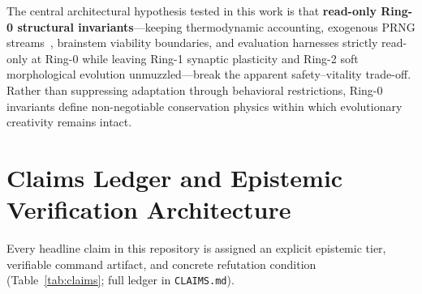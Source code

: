 \documentclass[11pt,reqno]{amsart}
\theoremstyle{plain}
\theoremstyle{definition}
\theoremstyle{remark}
\newcommand{\code}[1]{{\footnotesize\nolinkurl{#1}}}
\begin{document}
The central architectural hypothesis tested in this work is that \textbf{read-only Ring-0 structural invariants}---keeping thermodynamic accounting, exogenous PRNG streams~\cite{salmon2011parallel}, brainstem viability boundaries, and evaluation harnesses strictly read-only at Ring-0 while leaving Ring-1 synaptic plasticity and Ring-2 soft morphological evolution unmuzzled---break the apparent safety--vitality trade-off. Rather than suppressing adaptation through behavioral restrictions, Ring-0 invariants define non-negotiable conservation physics within which evolutionary creativity remains intact.

\section{Claims Ledger and Epistemic Verification Architecture}
\label{sec:claims}

Every headline claim in this repository is assigned an explicit epistemic tier, verifiable command artifact, and concrete refutation condition (Table~\ref{tab:claims}; full ledger in \code{CLAIMS.md}).
\end{document}
